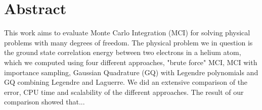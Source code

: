\section*{Abstract}
This work aims to evaluate Monte Carlo Integration (MCI) for solving physical
problems with many degrees of freedom. The physical problem we in question is
the ground state correlation energy between two electrons in a helium atom,
which we computed using four different approaches, "brute force" MCI, MCI with
importance sampling, Gaussian Quadrature (GQ) with Legendre polynomials and GQ
combining Legendre and Laguerre. We did an extensive comparison of the error,
CPU time and scalability of the different approaches. The result of our
comparison showed that... 


